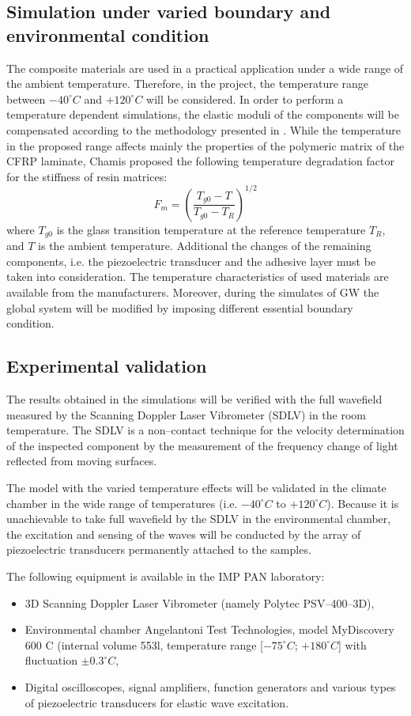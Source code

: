 \documentclass[a4paper,12pt]{article}
\begin{document}
\subsection{Simulation under varied boundary and environmental condition}
The composite materials are used in a practical application under a wide range of the ambient temperature. Therefore, in the project, the temperature range between $-40^{\circ} C$ and $+120^{\circ} C$ will be considered. In order to perform a temperature dependent simulations, the elastic moduli of the components will be compensated \cite{sikdar2018study,sikdar2018effects} according to the methodology presented in \cite{chamis1983simplified, salamone2009guided}. While the temperature in the proposed range affects mainly the properties of the polymeric matrix of the CFRP laminate, Chamis proposed the following temperature degradation factor for the stiffness of resin matrices:
\begin{equation}
F_m=\left (\frac{T_{g0}-T}{T_{g0}-T_R}\right)^{1/2}
\label{eq:temp_factor}
\end{equation}
where $T_{g0}$ is the glass transition temperature at the reference temperature $T_R$, and $T$ is the ambient temperature.
Additional the changes of the remaining components, i.e. the piezoelectric transducer and the adhesive layer must be taken into consideration. The temperature characteristics of used materials are available from the manufacturers.
Moreover, during the simulates of GW the global system will be modified by imposing different essential boundary condition.
\subsection{Experimental validation}
The results obtained in the simulations will be verified with the full wavefield measured by the Scanning Doppler Laser Vibrometer (SDLV) in the room temperature. The SDLV is a non--contact technique for the velocity determination of the inspected component by the measurement of the frequency change of light reflected from moving surfaces.

The model with the varied temperature effects will be validated in the climate chamber in the wide range of temperatures (i.e. $-40^{\circ} C$ to $+120^{\circ} C$). Because it is unachievable to take full wavefield by the SDLV in the environmental chamber, the excitation and sensing of the waves will be conducted by the array of piezoelectric transducers permanently attached to the samples.

The following equipment is available in the IMP PAN laboratory:
\begin{itemize}
	\item 3D Scanning Doppler Laser Vibrometer (namely Polytec PSV--400--3D),
	\item Environmental chamber Angelantoni Test Technologies, model MyDiscovery 600 C (internal volume 553l, temperature range [$-75^{\circ} C$; $+180^{\circ} C$] with fluctuation $\pm0.3^{\circ} C$,
	\item Digital oscilloscopes, signal amplifiers, function generators and various types of piezoelectric transducers for elastic wave excitation.
\end{itemize}
{}
\end{document}
